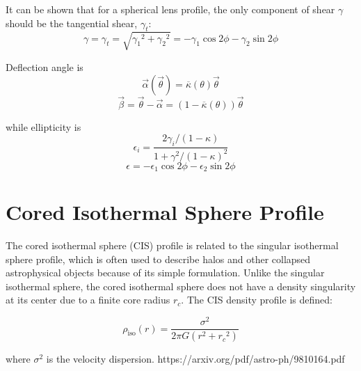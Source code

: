 \documentclass[10pt]{article}
\begin{document}
It can be shown that for a spherical lens profile, the only component of shear $\gamma$ should be the tangential shear, $\gamma_t$:
\citep{Dodelson2017}
\begin{equation}
\gamma = \gamma_t = \sqrt{{\gamma_1}^2 + {\gamma_2}^2} = -\gamma_1 \cos{2\phi} -\gamma_2 \sin{2\phi}
\end{equation}

Deflection angle is
\begin{equation}
\vec{\alpha}(\vec{\theta}) = \overline{\kappa}(\theta)\vec{\theta}
\end{equation}
\begin{equation}
\vec{\beta} = \vec{\theta} - \vec{\alpha} = (1 - \overline{\kappa}(\theta))\vec{\theta}
\end{equation}

while ellipticity is
\begin{equation}
\epsilon_i = \frac{2 \gamma_i/(1 - \kappa)}{1 + \gamma^2/(1 - \kappa)^2}
\end{equation}
\begin{equation}
\epsilon =  -\epsilon_1 \cos{2\phi} -\epsilon_2 \sin{2\phi}
\end{equation}



\section{Cored Isothermal Sphere Profile}
The cored isothermal sphere (CIS) profile is related to the singular isothermal sphere profile, which is often used to describe halos and other collapsed astrophysical objects because of its simple formulation. Unlike the singular isothermal sphere, the cored isothermal sphere does not have a density singularity at its center due to a finite core radius $r_c$. The CIS density profile is defined:

\begin{equation}
\rho_\mathrm{iso}(r) = \frac{\sigma^2}{2\pi G (r^2 + {r_c}^2)}
\end{equation}

where $\sigma^2$ is the velocity dispersion.
https://arxiv.org/pdf/astro-ph/9810164.pdf
%
%
\end{document}
